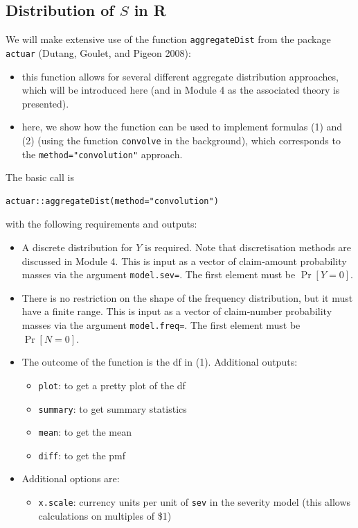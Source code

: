 \documentclass[11pt]{article}
\newcommand{\noi}{\noindent}
\begin{document}
\subsection{Distribution of $S$ in R}

\noi We will make extensive use of the function \texttt{aggregateDist} from the package \texttt{actuar} (Dutang, Goulet, and Pigeon 2008):
\begin{itemize}
  \item this function allows for several different aggregate distribution approaches, which will be introduced here (and in Module 4 as the associated theory is presented).
  \item here, we show how the function can be used to implement formulas (1) and (2) (using the function \texttt{convolve} in the background), which corresponds to the \texttt{method="convolution"} approach.
\end{itemize}

\noi The basic call is
\begin{lstlisting}
actuar::aggregateDist(method="convolution")
\end{lstlisting}
\noi with the following requirements and outputs:
\begin{itemize}
  \item A discrete distribution for \(Y\) is required.  Note that discretisation methods are discussed in Module 4.  This is input as a vector of claim‐amount probability masses via the argument \texttt{model.sev=}.  The first element must be \(\Pr[Y=0]\).
  \item There is no restriction on the shape of the frequency distribution, but it must have a finite range.  This is input as a vector of claim‐number probability masses via the argument \texttt{model.freq=}.  The first element must be \(\Pr[N=0]\).
  \item The outcome of the function is the df in (1).  Additional outputs:
    \begin{itemize}
      \item \texttt{plot}: to get a pretty plot of the df
      \item \texttt{summary}: to get summary statistics
      \item \texttt{mean}: to get the mean
      \item \texttt{diff}: to get the pmf
    \end{itemize}
  \item Additional options are:
    \begin{itemize}
      \item \texttt{x.scale}: currency units per unit of \texttt{sev} in the severity model (this allows calculations on multiples of \$1)
    \end{itemize}
\end{itemize}
\end{document}
